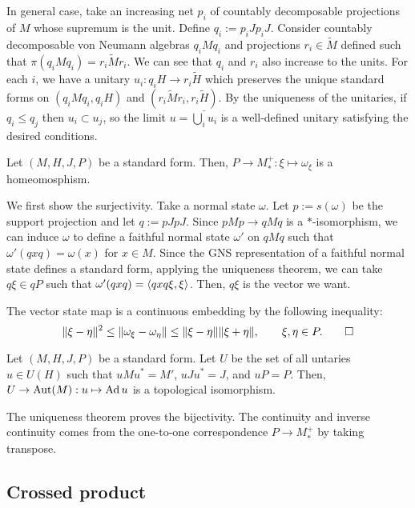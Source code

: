 \documentclass{../../../small}
\begin{document}
\begin{pf}
In general case, take an increasing net $p_i$ of countably decomposable projections of $M$ whose supremum is the unit.
Define $q_i:=p_iJp_iJ$.
Consider countably decomposable von Neumann algebras $q_iMq_i$ and projections $r_i\in\tilde M$ defined such that $\pi(q_iMq_i)=r_i\tilde Mr_i$.
We can see that $q_i$ and $r_i$ also increase to the units.
For each $i$, we have a unitary $u_i:q_iH\to r_i\tilde H$ which preserves the unique standard forms on $(q_iMq_i,q_iH)$ and $(r_i\tilde M r_i,r_i\tilde H)$.
By the uniqueness of the unitaries, if $q_i\le q_j$ then $u_i\subset u_j$, so the limit $u=\bar{\bigcup_iu_i}$ is a well-defined unitary satisfying the desired conditions.
\end{pf}

\begin{cor}
Let $(M,H,J,P)$ be a standard form.
Then, $P\to M_*^+:\xi\mapsto\omega_\xi$ is a homeomosphism.
\end{cor}
\begin{pf}
We first show the surjectivity.
Take a normal state $\omega$.
Let $p:=s(\omega)$ be the support projection and let $q:=pJpJ$.
Since $pMp\to qMq$ is a $*$-isomorphism, we can induce $\omega$ to define a faithful normal state $\omega'$ on $qMq$ such that $\omega'(qxq)=\omega(x)$ for $x\in M$.
Since the GNS representation of a faithful normal state defines a standard form, applying the uniqueness theorem, we can take $q\xi\in qP$ such that $\omega'(qxq)=\langle qxq\xi,\xi\rangle$.
Then, $q\xi$ is the vector we want.

The vector state map is a continuous embedding by the following inequality:
\[\|\xi-\eta\|^2\le\|\omega_\xi-\omega_\eta\|\le\|\xi-\eta\|\|\xi+\eta\|,\qquad\xi,\eta\in P.\qedhere\]
\end{pf}

\begin{cor}
Let $(M,H,J,P)$ be a standard form.
Let $U$ be the set of all untaries $u\in U(H)$ such that $uMu^*=M'$, $uJu^*=J$, and $uP=P$.
Then, $U\to\operatorname{Aut}(M):u\mapsto\operatorname{Ad} u$ is a topological isomorphism.
\end{cor}
\begin{pf}
The uniqueness theorem proves the bijectivity.
The continuity and inverse continuity comes from the one-to-one correspondence $P\to M_*^+$ by taking transpose.
\end{pf}



\subsection{Crossed product}
\end{document}
